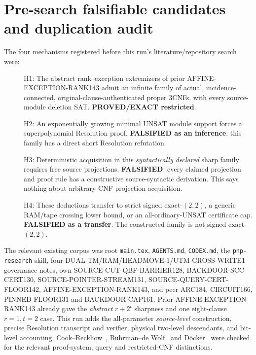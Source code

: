 \documentclass[11pt]{article}
\begin{document}
\section{Pre-search falsifiable candidates and duplication audit}
The four mechanisms registered before this run's literature/repository
search were:
\begin{description}
\item[] H1: The abstract rank--exception extremizers of prior
AFFINE-EXCEPTION-RANK143 admit an infinite family of actual,
incidence-connected, original-clause-authenticated proper 3CNFs,
with every source-module deletion SAT. \textbf{PROVED/EXACT restricted}.
\item[] H2: An exponentially growing minimal UNSAT module support
forces a superpolynomial Resolution proof. \textbf{FALSIFIED as an
inference}: this family has a direct short Resolution refutation.
\item[] H3: Deterministic acquisition in this \emph{syntactically
declared} sharp family requires free source projections.
\textbf{FALSIFIED}: every claimed projection and proof rule has
a constructive source-syntactic derivation. This says nothing
about arbitrary CNF projection acquisition.
\item[] H4: These deductions transfer to strict signed exact-$(2,2)$,
a generic RAM/tape crossing lower bound, or an all-ordinary-UNSAT
certificate cap. \textbf{FALSIFIED as a transfer}. The constructed
family is not signed exact-$(2,2)$.
\end{description}
The relevant existing corpus was root \texttt{main.tex},
\texttt{AGENTS.md}, \texttt{CODEX.md}, the \texttt{pnp-research}
skill, four DUAL-TM/RAM/HEADMOVE-1/UTM-CROSS-WRITE1 governance
notes, own SOURCE-CUT-QBF-BARRIER128, BACKDOOR-SCC-CERT130,
SOURCE-POINTER-STREAM131, SOURCE-QUERY-CERT-FLOOR142,
AFFINE-EXCEPTION-RANK143, and peer ARC184, CIRCUIT166,
PINNED-FLOOR131 and BACKDOOR-CAP161.
Prior AFFINE-EXCEPTION-RANK143 already gave the \emph{abstract}
$r+2^t$ sharpness and one eight-clause $r=1,t=2$ case.
This run adds the all-parameter \emph{source-level}
construction, precise Resolution transcript and verifier,
physical two-level descendants, and bit-level accounting.
Cook--Reckhow~\cite{CR}, Buhrman--de Wolf~\cite{BDW}
and D\"ocker~\cite{DOK} were checked for the relevant
proof-system, query and restricted-CNF distinctions.
\end{document}
